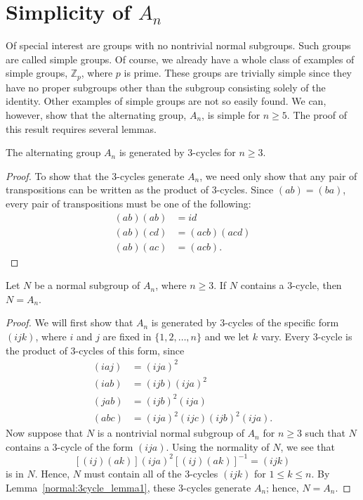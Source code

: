  

 
 
\section{Simplicity of $A_n$}
 
 
Of special interest are groups with no nontrivial normal subgroups.
Such groups are called {\bfi simple
groups}.  Of course, we
already have a whole class of examples of simple groups, ${\mathbb Z}_p$,
where $p$ is prime.  These groups are trivially simple since they have
no proper subgroups other than the subgroup consisting solely of the
identity. Other examples of simple groups are not so easily found.
We can, however, show that the alternating group, $A_n$, is simple for
$n \geq 5$. The proof of this result requires several lemmas. 
 
 
\begin{lemma}\label{normal:3cycle_lemma1}
The alternating group $A_n$ is generated by $3$-cycles for $n \geq 3$.
\end{lemma}
 
\begin{proof}
To show that the 3-cycles generate $A_n$, we need only show that any
pair of transpositions can be written as the product of 3-cycles.
Since $(a b) = (b a)$, every pair of transpositions must be one of the
following: 
\begin{align*}
(ab)(ab) & = id \\
(ab)(cd) & = (acb)(acd) \\
(ab)(ac) & = (acb).
\end{align*}
\end{proof}
 
 
\begin{lemma}\label{normal:3cycle_lemma2}
Let $N$ be a  normal subgroup of $A_n$, where $n \geq 3$. If $N$ 
contains a $3$-cycle, then $N = A_n$. 
\end{lemma}
 
 
\begin{proof}
We will first show that $A_n$ is generated by 3-cycles of the specific
form $(ijk)$, where $i$ and $j$ are fixed in  $\{ 1, 2, \ldots, n \}$
and we let $k$ vary. Every 3-cycle is the product of 3-cycles of this 
form, since
\begin{align*}
(i a j) & = (i j a)^2  \\
(i a b) & = (i j b) (i j a)^2 \\
(j a b) & = (i j b)^2 (i j a) \\
(a b c) & = (i j a)^2 (i j c) (i j b)^2 (i j a).
\end{align*}
Now suppose that $N$ is a nontrivial normal subgroup of $A_n$ for $n 
\geq 3$  such that $N$ contains a 3-cycle of the form $(i j a)$. Using
the normality of $N$, we see that
\[
[(i j)(a k)](i j a)^2 [(i j)(a k)]^{-1} = (i j k)
\]
is in $N$. Hence, $N$ must contain all of the 3-cycles $(i j k)$ 
for $1 \leq k \leq n$. By Lemma~\ref{normal:3cycle_lemma1}, these 3-cycles generate $A_n$; 
hence, $N = A_n$. 
\end{proof}
 
